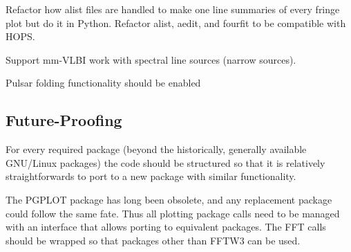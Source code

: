 \begin{description}
 Refactor how alist files are handled to make one line
    summaries of every fringe plot but do it in Python.
 Refactor alist, aedit, and fourfit to be compatible with \ac{HOPS}.


 Support mm-VLBI work with spectral line sources (narrow sources).

 Pulsar folding functionality should be enabled

\end{description}

\subsection{Future-Proofing}
\label{sec:future}

For every required package (beyond the historically, generally
available \ac{GNU/Linux} packages) the code should be structured so
that it is relatively straightforwards to port to a new package with
similar functionality.

\begin{description}
 The \ac{PGPLOT} package has long been obsolete, and any replacement
    package could follow the same fate.  Thus all plotting package calls
    need to be managed with an interface that allows porting to equivalent
    packages.
 The \ac{FFT} calls should be wrapped so that packages other than
    \ac{FFTW3} can be used.
\end{description}


%
%
